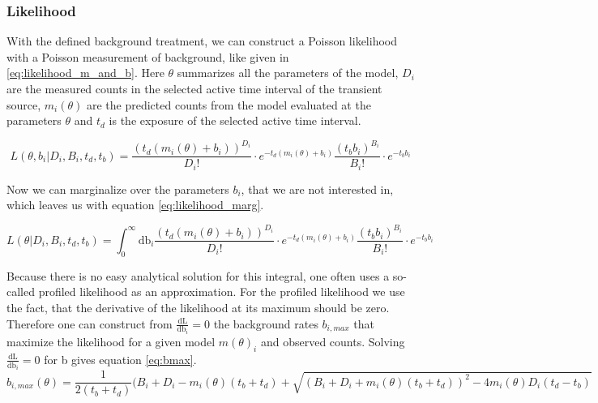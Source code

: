 \documentclass[modern]{aastex631}
\begin{document}

\subsubsection*{Likelihood}

With the defined background treatment, we can construct a Poisson likelihood with a Poisson measurement of background, like given in \ref{eq:likelihood_m_and_b}. Here $\theta$ summarizes all the parameters of the model, $D_{i}$ are the measured counts in the selected active time interval of the transient source, $m_{i}(\theta)$ are the predicted counts from the model evaluated at the parameters $\theta$ and $t_{d}$ is the exposure of the selected active time interval.

\begin{equation}
	L(\theta, b_{i}|D_{i}, B_{i},t_{d},t_{b}) = \frac{(t_{d}(m_{i}(\theta)+ b_{i}))^{D_{i}}}{D_{i}!}\cdot e^{-t_{d}(m_{i}(\theta)+b_{i})} \frac{(t_{b} b_{i})^{B_{i}}}{B_{i}!}\cdot e^{-t_{b} b_{i}}
  \label{eq:likelihood_m_and_b}
\end{equation}

Now we can marginalize over the parameters $b_{i}$, that we are not interested in, which leaves us with equation \ref{eq:likelihood_marg}.

\begin{equation}
	L(\theta|D_{i}, B_{i},t_{d},t_{b}) = \int_{0}^{\infty}\textrm{db}_{i}\frac{(t_{d}(m_{i}(\theta)+ b_{i}))^{D_{i}}}{D_{i}!}\cdot e^{-t_{d}(m_{i}(\theta)+b_{i})} \frac{(t_{b} b_{i})^{B_{i}}}{B_{i}!}\cdot e^{-t_{b}b_{i}}
  \label{eq:likelihood_marg}
\end{equation}

Because there is no easy analytical solution for this integral, one often uses a so-called profiled likelihood as an approximation. For the profiled likelihood we use the fact, that the derivative of the likelihood at its maximum should be zero. Therefore one can construct from $\frac{\textrm{dL}}{\textrm{db}_i}=0$ the background rates $b_{i, max}$ that maximize the likelihood for a given model $m(\theta)_{i}$ and observed counts. Solving $\frac{\textrm{dL}}{\textrm{db}_i}=0$ for b gives equation \ref{eq:bmax}.
\begin{equation}
	b_{i,max}(\theta)=\frac{1}{2(t_{b}+t_{d})}(B_{i}+D_{i}-m_{i}(\theta)(t_{b}+t_{d})+\sqrt{(B_{i}+D_{i}+m_{i}(\theta)(t_{b}+t_{d}))^{2}-4m_{i}(\theta)D_{i}(t_{d}-t_{b})}
  \label{eq:bmax}
\end{equation}
\end{document}
